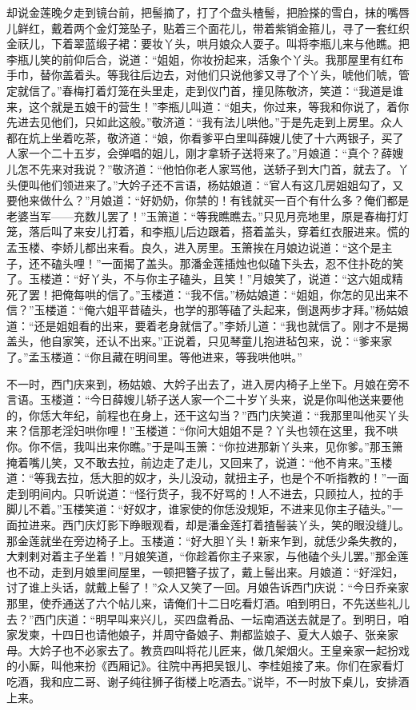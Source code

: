 却说金莲晚夕走到镜台前，把髻摘了，打了个盘头楂髻，把脸搽的雪白，抹的嘴唇儿鲜红，戴着两个金灯笼坠子，贴着三个面花儿，带着紫销金箍儿，寻了一套红织金祆儿，下着翠蓝缎子裙：要妆丫头，哄月娘众人耍子。叫将李瓶儿来与他瞧。把李瓶儿笑的前仰后合，说道：“姐姐，你妆扮起来，活象个丫头。我那屋里有红布手巾，替你盖着头。等我往后边去，对他们只说他爹又寻了个丫头，唬他们唬，管定就信了。”春梅打着灯笼在头里走，走到仪门首，撞见陈敬济，笑道：“我道是谁来，这个就是五娘干的营生！”李瓶儿叫道：“姐夫，你过来，等我和你说了，着你先进去见他们，只如此这般。”敬济道：“我有法儿哄他。”于是先走到上房里。众人都在炕上坐着吃茶，敬济道：“娘，你看爹平白里叫薛嫂儿使了十六两银子，买了人家一个二十五岁，会弹唱的姐儿，刚才拿轿子送将来了。”月娘道：“真个？薛嫂儿怎不先来对我说？”敬济道：“他怕你老人家骂他，送轿子到大门首，就去了。丫头便叫他们领进来了。”大妗子还不言语，杨姑娘道：“官人有这几房姐姐勾了，又要他来做什么？”月娘道：“好奶奶，你禁的！有钱就买一百个有什么多？俺们都是老婆当军——充数儿罢了！”玉箫道：“等我瞧瞧去。”只见月亮地里，原是春梅打灯笼，落后叫了来安儿打着，和李瓶儿后边跟着，搭着盖头，穿着红衣服进来。慌的孟玉楼、李娇儿都出来看。良久，进入房里。玉箫挨在月娘边说道：“这个是主子，还不磕头哩！”一面揭了盖头。那潘金莲插烛也似磕下头去，忍不住扑矻的笑了。玉楼道：“好丫头，不与你主子磕头，且笑！”月娘笑了，说道：“这六姐成精死了罢！把俺每哄的信了。”玉楼道：“我不信。”杨姑娘道：“姐姐，你怎的见出来不信？”玉楼道：“俺六姐平昔磕头，也学的那等磕了头起来，倒退两步才拜。”杨姑娘道：“还是姐姐看的出来，要着老身就信了。”李娇儿道：“我也就信了。刚才不是揭盖头，他自家笑，还认不出来。”正说着，只见琴童儿抱进毡包来，说：“爹来家了。”孟玉楼道：“你且藏在明间里。等他进来，等我哄他哄。”

不一时，西门庆来到，杨姑娘、大妗子出去了，进入房内椅子上坐下。月娘在旁不言语。玉楼道：“今日薛嫂儿轿子送人家一个二十岁丫头来，说是你叫他送来要他的，你恁大年纪，前程也在身上，还干这勾当？”西门庆笑道：“我那里叫他买丫头来？信那老淫妇哄你哩！”玉楼道：“你问大姐姐不是？丫头也领在这里，我不哄你。你不信，我叫出来你瞧。”于是叫玉箫：“你拉进那新丫头来，见你爹。”那玉箫掩着嘴儿笑，又不敢去拉，前边走了走儿，又回来了，说道：“他不肯来。”玉楼道：“等我去拉，恁大胆的奴才，头儿没动，就扭主子，也是个不听指教的！”一面走到明间内。只听说道：“怪行货子，我不好骂的！人不进去，只顾拉人，拉的手脚儿不着。”玉楼笑道：“好奴才，谁家使的你恁没规矩，不进来见你主子磕头。”一面拉进来。西门庆灯影下睁眼观看，却是潘金莲打着揸髻装丫头，笑的眼没缝儿。那金莲就坐在旁边椅子上。玉楼道：“好大胆丫头！新来乍到，就恁少条失教的，大剌剌对着主子坐着！”月娘笑道，“你趁着你主子来家，与他磕个头儿罢。”那金莲也不动，走到月娘里间屋里，一顿把簪子拔了，戴上髻出来。月娘道：“好淫妇，讨了谁上头话，就戴上髻了！”众人又笑了一回。月娘告诉西门庆说：“今日乔亲家那里，使乔通送了六个帖儿来，请俺们十二日吃看灯酒。咱到明日，不先送些礼儿去？”西门庆道：“明早叫来兴儿，买四盘肴品、一坛南酒送去就是了。到明日，咱家发柬，十四日也请他娘子，并周守备娘子、荆都监娘子、夏大人娘子、张亲家母。大妗子也不必家去了。教贲四叫将花儿匠来，做几架烟火。王皇亲家一起扮戏的小厮，叫他来扮《西厢记》。往院中再把吴银儿、李桂姐接了来。你们在家看灯吃酒，我和应二哥、谢子纯往狮子街楼上吃酒去。”说毕，不一时放下桌儿，安排酒上来。

